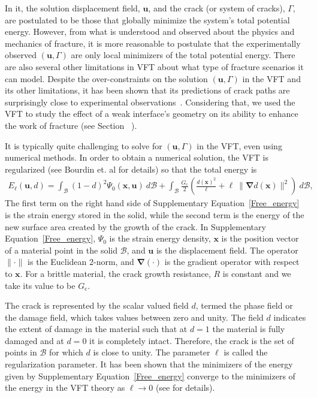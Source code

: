 \documentclass[12pt,onecolumn]{article}
\makeatletter
\DeclareRobustCommand*{\nameref}[1]{%
      \emph{\myorg@nameref{#1}}%
    }%
\newcommand{\bs}[1]{\ensuremath{\mathbf{#1}}}
\makeatother
\begin{document}
\begin{bibunit}
In it, the solution displacement field, $\bs{u}$, and the  crack (or system of cracks), $\Gamma$, are postulated to be those that globally minimize the system's total potential energy. However, from what is understood and observed about the  physics and mechanics of fracture, it is more reasonable to postulate that the experimentally observed $(\bs{u},\Gamma)$ are only local minimizers of the total potential energy. There are also several other limitations in VFT about what type of fracture scenarios it can model. Despite  the over-constraints on the solution $(\bs{u},\Gamma)$ in the VFT and its other limitations, it has been shown that its  predictions of crack paths are surprisingly close to experimental observations~\cite{borden_2012,bourdin2000numerical}. Considering that, we used the VFT to study the effect of a weak interface's geometry on its ability to enhance the work of fracture (see Section~\nameref{sec:discussion}). 
 
It is typically quite challenging to solve for $(\bs{u},\Gamma)$ in the VFT, even using numerical methods. In order to obtain a numerical solution, the VFT is regularized (see Bourdin et. al \cite{bourdin2000numerical} for details) so that the total energy is 
%
  \begin{align}\label{Free_energy}
	E_{\mathrm{\ell}}(\bs{u},d) = \int_\mathcal{B} (1-d)^2\Psi_0(\bs{x},\bs{u}) \ d\mathcal{B} + \int_\mathcal{B} \frac{G_\mathrm{c}}{2} \left(\frac{d(\bs{x})^2}{\ell} + \ell~ \lVert\bm{\nabla}d(\bs{x})\rVert^2\right) \ d\mathcal{B},  
\end{align}
%
The first term on the right hand side of Supplementary Equation~\eqref{Free_energy} is the strain energy stored in the solid, while the second term is the energy of the new surface area created by the growth of the crack. In Supplementary Equation~\eqref{Free_energy}, $\Psi_0$ is the strain energy density, $\bs{x}$ is the position vector of a material point in the solid $\mathcal{B}$, and $\bs{u}$ is the displacement field. The operator $\lVert \cdot \rVert$ is the Euclidean 2-norm, and $\bm{\nabla}(\cdot)$ is the gradient operator with respect to $\bs{x}$. For a brittle material, the crack growth resistance, $R$ is constant and we take its value to be $G_\mathrm{c}$.

The crack is represented by the scalar valued field $d$, termed the phase field or the damage field, which takes values between zero and unity. The field $d$ indicates the extent of damage in the material such that at $d=1$ the material is fully damaged  and at $d=0$ it is completely intact. Therefore, the crack is the set of points in $\mathcal{B}$ for which $d$ is close to unity. The parameter $\ell$ is called the regularization parameter. It has been shown  that the minimizers of the energy given by Supplementary Equation~\eqref{Free_energy} converge to the minimizers of the energy in the VFT theory as $\ell \to 0$ (see \cite{chambolle_2005,ambrosio_1990a,bourdin_2008} for details). 


\end{bibunit}
\end{document}
